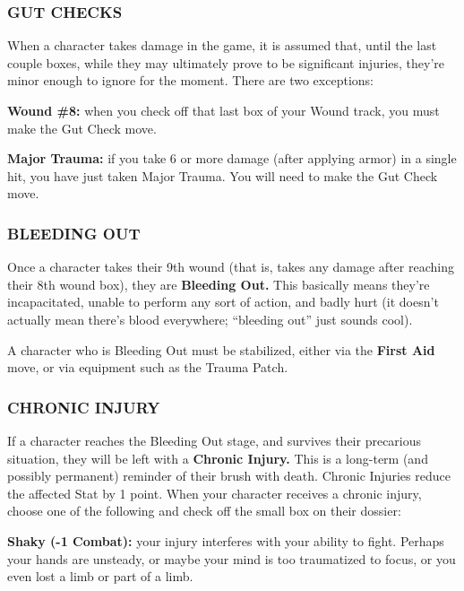 \documentclass[oneside,10pt]{article}
\begin{document}
\begin{multicols}{2}
\subsubsection{GUT CHECKS}

When a character takes damage in the game, it is assumed
that, until the last couple boxes, while they may ultimately
prove to be significant injuries, they’re minor enough to ignore for the moment. There are two exceptions:

\begin{adjustwidth*}{.5cm}{.5cm}
\textbf{Wound \#8:} when you check off that last box of your
Wound track, you must make the Gut Check move.

\textbf{Major Trauma:} if you take 6 or more damage (after applying armor) in a single hit, you have just taken Major Trauma. You will need to make the Gut Check move.
\end{adjustwidth*}

\subsubsection{BLEEDING OUT}
Once a character takes their 9th wound (that is, takes any
damage after reaching their 8th wound box), they are \textbf{Bleeding Out.} This basically means they’re incapacitated, unable to
perform any sort of action, and badly hurt (it doesn’t actually
mean there’s blood everywhere; “bleeding out” just sounds
cool).

A character who is Bleeding Out must be stabilized, either
via the \textbf{First Aid} move, or via equipment such as the Trauma
Patch.

\subsubsection{CHRONIC INJURY}
If a character reaches the Bleeding Out stage, and survives
their precarious situation, they will be left with a \textbf{Chronic Injury.} This is a long-term (and possibly permanent) reminder
of their brush with death. Chronic Injuries reduce the affected
Stat by 1 point. When your character receives a
chronic injury, choose one of the following and
check off the small box on their dossier:
\begin{adjustwidth*}{.5cm}{.5cm}

\textbf{Shaky (-1 Combat):} your injury interferes with your ability
to fight. Perhaps your hands are unsteady, or maybe your
mind is too traumatized to focus, or you even lost a limb
or part of a limb.


\end{adjustwidth*}
\end{multicols}
\end{document}
